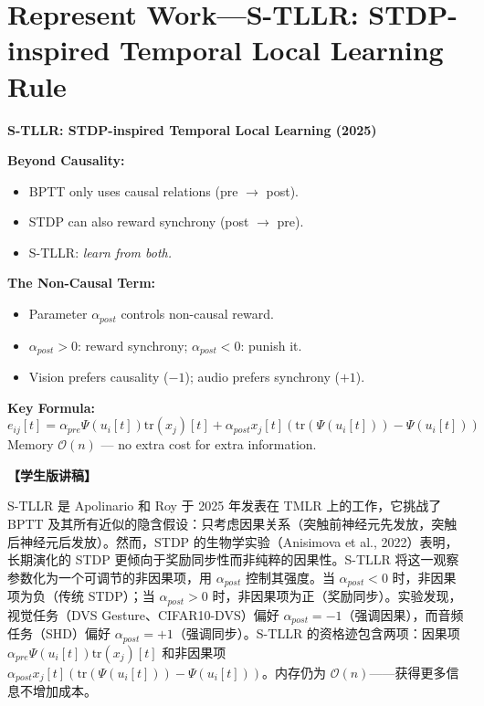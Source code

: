 \documentclass[journal,12pt,onecolumn]{IEEEtran}
\begin{document}
\section{Represent Work—S-TLLR: STDP-inspired Temporal Local Learning Rule}

\bigskip\noindent\textbf{S-TLLR: STDP-inspired Temporal Local Learning (2025)}\par\smallskip
\textbf{Beyond Causality:}
\begin{itemize}
    \item BPTT only uses causal relations (pre $\to$ post).
    \item STDP can also reward synchrony (post $\to$ pre).
    \item S-TLLR: \textit{learn from both.}
\end{itemize}
\textbf{The Non-Causal Term:}
\begin{itemize}
    \item Parameter $\alpha_{post}$ controls non-causal reward.
    \item $\alpha_{post} > 0$: reward synchrony; $\alpha_{post} < 0$: punish it.
    \item Vision prefers causality ($-1$); audio prefers synchrony ($+1$).
\end{itemize}
\textbf{Key Formula:}
\begin{equation}
    e_{ij}[t] = \alpha_{pre}\Psi(u_i[t])\text{tr}(x_j)[t] + \alpha_{post}x_j[t](\text{tr}(\Psi(u_i[t]))-\Psi(u_i[t]))
\end{equation}
Memory $\mathcal{O}(n)$ — no extra cost for extra information.

\textbf{【学生版讲稿】}

S-TLLR 是 Apolinario 和 Roy 于 2025 年发表在 TMLR 上的工作，它挑战了 BPTT 及其所有近似的隐含假设：只考虑因果关系（突触前神经元先发放，突触后神经元后发放）。然而，STDP 的生物学实验（Anisimova et al., 2022）表明，长期演化的 STDP 更倾向于奖励同步性而非纯粹的因果性。S-TLLR 将这一观察参数化为一个可调节的非因果项，用 $\alpha_{post}$ 控制其强度。当 $\alpha_{post}<0$ 时，非因果项为负（传统 STDP）；当 $\alpha_{post}>0$ 时，非因果项为正（奖励同步）。实验发现，视觉任务（DVS Gesture、CIFAR10-DVS）偏好 $\alpha_{post}=-1$（强调因果），而音频任务（SHD）偏好 $\alpha_{post}=+1$（强调同步）。S-TLLR 的资格迹包含两项：因果项 $\alpha_{pre}\Psi(u_i[t])\text{tr}(x_j)[t]$ 和非因果项 $\alpha_{post}x_j[t](\text{tr}(\Psi(u_i[t]))-\Psi(u_i[t]))$。内存仍为 $\mathcal{O}(n)$——获得更多信息不增加成本。
\end{document}

